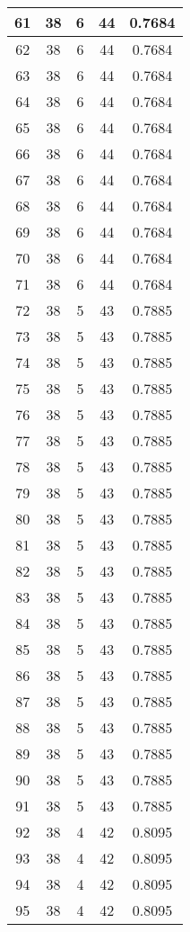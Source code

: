 \documentclass[letterpaper, 12pt]{article}
\begin{document}
\begin{longtable}{|c|c|c|c|c|}
61 & 38 & 6 & 44 & 0.7684 \\
\hline
62 & 38 & 6 & 44 & 0.7684 \\
\hline
63 & 38 & 6 & 44 & 0.7684 \\
\hline
64 & 38 & 6 & 44 & 0.7684 \\
\hline
65 & 38 & 6 & 44 & 0.7684 \\
\hline
66 & 38 & 6 & 44 & 0.7684 \\
\hline
67 & 38 & 6 & 44 & 0.7684 \\
\hline
68 & 38 & 6 & 44 & 0.7684 \\
\hline
69 & 38 & 6 & 44 & 0.7684 \\
\hline
70 & 38 & 6 & 44 & 0.7684 \\
\hline
71 & 38 & 6 & 44 & 0.7684 \\
\hline
72 & 38 & 5 & 43 & 0.7885 \\
\hline
73 & 38 & 5 & 43 & 0.7885 \\
\hline
74 & 38 & 5 & 43 & 0.7885 \\
\hline
75 & 38 & 5 & 43 & 0.7885 \\
\hline
76 & 38 & 5 & 43 & 0.7885 \\
\hline
77 & 38 & 5 & 43 & 0.7885 \\
\hline
78 & 38 & 5 & 43 & 0.7885 \\
\hline
79 & 38 & 5 & 43 & 0.7885 \\
\hline
80 & 38 & 5 & 43 & 0.7885 \\
\hline
81 & 38 & 5 & 43 & 0.7885 \\
\hline
82 & 38 & 5 & 43 & 0.7885 \\
\hline
83 & 38 & 5 & 43 & 0.7885 \\
\hline
84 & 38 & 5 & 43 & 0.7885 \\
\hline
85 & 38 & 5 & 43 & 0.7885 \\
\hline
86 & 38 & 5 & 43 & 0.7885 \\
\hline
87 & 38 & 5 & 43 & 0.7885 \\
\hline
88 & 38 & 5 & 43 & 0.7885 \\
\hline
89 & 38 & 5 & 43 & 0.7885 \\
\hline
90 & 38 & 5 & 43 & 0.7885 \\
\hline
91 & 38 & 5 & 43 & 0.7885 \\
\hline
92 & 38 & 4 & 42 & 0.8095 \\
\hline
93 & 38 & 4 & 42 & 0.8095 \\
\hline
94 & 38 & 4 & 42 & 0.8095 \\
\hline
95 & 38 & 4 & 42 & 0.8095 \\

\end{longtable}
\end{document}
